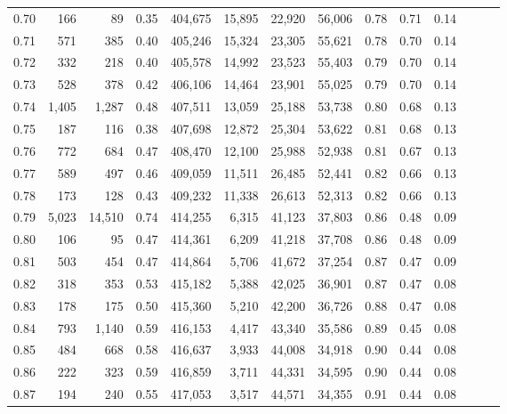 \begin{tabular}{rrrrrrrrrrrrrr}
0.70 &     166 &      89 &  0.35 &  404,675 &   15,895 &  22,920 &  56,006 &  0.78 &  0.71 &      0.14 \\
0.71 &     571 &     385 &  0.40 &  405,246 &   15,324 &  23,305 &  55,621 &  0.78 &  0.70 &      0.14 \\
0.72 &     332 &     218 &  0.40 &  405,578 &   14,992 &  23,523 &  55,403 &  0.79 &  0.70 &      0.14 \\
0.73 &     528 &     378 &  0.42 &  406,106 &   14,464 &  23,901 &  55,025 &  0.79 &  0.70 &      0.14 \\
0.74 &   1,405 &   1,287 &  0.48 &  407,511 &   13,059 &  25,188 &  53,738 &  0.80 &  0.68 &      0.13 \\
0.75 &     187 &     116 &  0.38 &  407,698 &   12,872 &  25,304 &  53,622 &  0.81 &  0.68 &      0.13 \\
0.76 &     772 &     684 &  0.47 &  408,470 &   12,100 &  25,988 &  52,938 &  0.81 &  0.67 &      0.13 \\
0.77 &     589 &     497 &  0.46 &  409,059 &   11,511 &  26,485 &  52,441 &  0.82 &  0.66 &      0.13 \\
0.78 &     173 &     128 &  0.43 &  409,232 &   11,338 &  26,613 &  52,313 &  0.82 &  0.66 &      0.13 \\
0.79 &   5,023 &  14,510 &  0.74 &  414,255 &    6,315 &  41,123 &  37,803 &  0.86 &  0.48 &      0.09 \\
0.80 &     106 &      95 &  0.47 &  414,361 &    6,209 &  41,218 &  37,708 &  0.86 &  0.48 &      0.09 \\
0.81 &     503 &     454 &  0.47 &  414,864 &    5,706 &  41,672 &  37,254 &  0.87 &  0.47 &      0.09 \\
0.82 &     318 &     353 &  0.53 &  415,182 &    5,388 &  42,025 &  36,901 &  0.87 &  0.47 &      0.08 \\
0.83 &     178 &     175 &  0.50 &  415,360 &    5,210 &  42,200 &  36,726 &  0.88 &  0.47 &      0.08 \\
0.84 &     793 &   1,140 &  0.59 &  416,153 &    4,417 &  43,340 &  35,586 &  0.89 &  0.45 &      0.08 \\
0.85 &     484 &     668 &  0.58 &  416,637 &    3,933 &  44,008 &  34,918 &  0.90 &  0.44 &      0.08 \\
0.86 &     222 &     323 &  0.59 &  416,859 &    3,711 &  44,331 &  34,595 &  0.90 &  0.44 &      0.08 \\
0.87 &     194 &     240 &  0.55 &  417,053 &    3,517 &  44,571 &  34,355 &  0.91 &  0.44 &      0.08 \\

\end{tabular}
